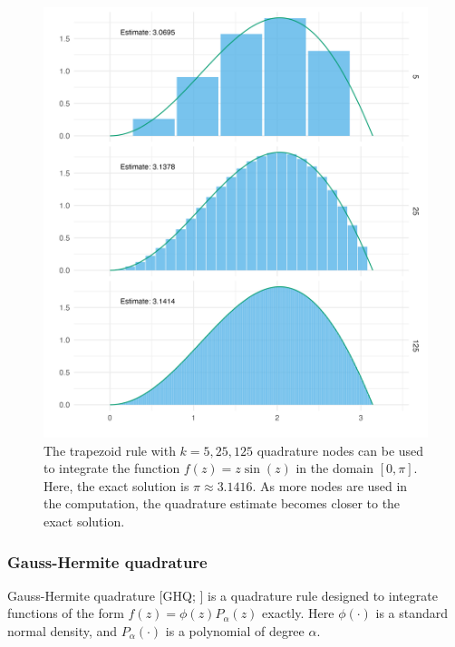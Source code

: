 \documentclass[a4paper, nobind]{templates/ociamthesis}
\begin{document}
\begin{figure}

{\centering \includegraphics[width=0.95\linewidth]{figures/naomi-aghq/trapezoid} 

}

\caption{The trapezoid rule with \(k = 5, 25, 125\) quadrature nodes can be used to integrate the function \(f(z) = z \sin(z)\) in the domain \([0, \pi]\). Here, the exact solution is \(\pi \approx 3.1416\). As more nodes are used in the computation, the quadrature estimate becomes closer to the exact solution.}\label{fig:trapezoid}
\end{figure}

\hypertarget{gauss-hermite-quadrature}{%
\subsubsection{Gauss-Hermite quadrature}\label{gauss-hermite-quadrature}}

Gauss-Hermite quadrature {[}GHQ; \textcite{davis1975methods}{]} is a quadrature rule designed to integrate functions of the form \(f(z) = \phi(z) P_\alpha(z)\) exactly.
Here \(\phi(\cdot)\) is a standard normal density, and \(P_\alpha(\cdot)\) is a polynomial of degree \(\alpha\).
\end{document}
